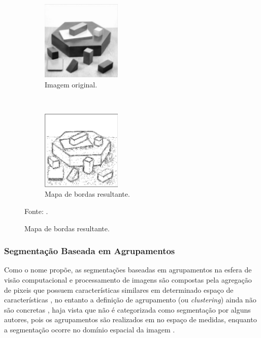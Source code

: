 \begin{figure}[H]
   \caption{Segmentação com operador Laplaciano.}
   \centering
   \label{segment:fig:8}
    \begin{subfigure}[t]{0.45\textwidth}
        \centering
        \includegraphics[height=1.5in]{recursos/imagens/image_seg/ol1.png}
        \caption{Imagem original.}
        \label{segment:fig:8.1}
    \end{subfigure}%
    ~ 
    \begin{subfigure}[t]{0.45\textwidth}
        \centering
        \includegraphics[height=1.5in]{recursos/imagens/image_seg/lp2.png}
        \caption{Mapa de bordas resultante.}
        \label{segment:fig:8.2}
    \end{subfigure}%

    \vspace*{1 cm}
    Fonte: \cite{pedrini2008analise}.
\end{figure}


\subsubsection{Segmentação Baseada em Agrupamentos}

Como o nome propõe, as segmentações baseadas em agrupamentos na esfera de visão computacional e processamento de imagens são compostas pela agregação de pixeis que possuem características similares em determinado espaço de características \cite{Yuheng2017ImageOverview}, no entanto a definição de agrupamento (ou \textit{clustering}) ainda não são concretas \cite{Yuheng2017ImageOverview}, haja vista que não é categorizada como segmentação por alguns autores, pois os agrupamentos são realizados em no espaço de medidas, enquanto a segmentação ocorre no domínio espacial da imagem \cite{Haralick1985}.

